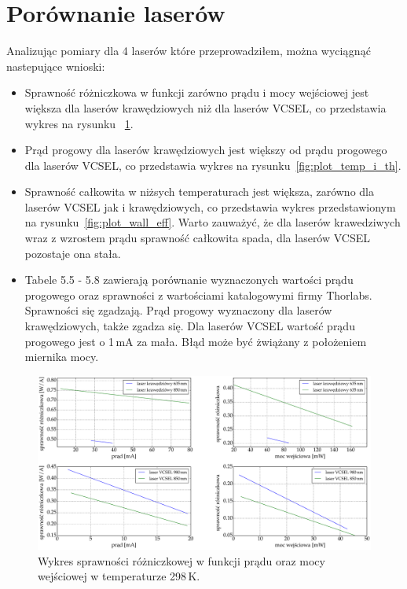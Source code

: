 \section{Porównanie laserów}
Analizując pomiary dla 4 laserów które przeprowadziłem, można wyciągnąć nastepujące wnioski:
\begin{itemize}
\item Sprawność różniczkowa  w funkcji zarówno prądu i mocy wejściowej jest większa dla laserów krawędziowych niż dla laserów
 VCSEL, co przedstawia wykres na rysunku ~\ref{fig:plot_eff}.
\item Prąd progowy dla laserów krawędziowych jest większy od prądu progowego dla laserów VCSEL, co przedstawia wykres
na rysunku~\ref{fig:plot_temp_i_th}.
\item Sprawność całkowita w niżsych temperaturach jest większa, zarówno dla laserów VCSEL jak i krawędziowych, co przedstawia
wykres przedstawionym na rysunku~\ref{fig:plot_wall_eff}. Warto zauważyć, że dla laserów krawedziwych wraz z wzrostem prądu
sprawność całkowita spada, dla laserów VCSEL pozostaje ona stała.
\item Tabele 5.5 - 5.8 zawierają porównanie wyznaczonych wartości prądu progowego oraz sprawności z wartościami katalogowymi
firmy Thorlabs. Sprawności się zgadzają. Prąd progowy wyznaczony dla laserów krawędziowych, także zgadza się. Dla laserów VCSEL
wartość prądu progowego jest o 1\,mA za mała. Błąd może być żwiążany z położeniem miernika mocy.
\end{itemize}
\begin{figure}[H]
\center
  \includegraphics[scale=0.30]{plot_common/plot_eff.eps}
  \caption{Wykres sprawności różniczkowej w funkcji prądu oraz mocy wejściowej w temperaturze 298\,K.}
  \label{fig:plot_eff}
\end{figure}
